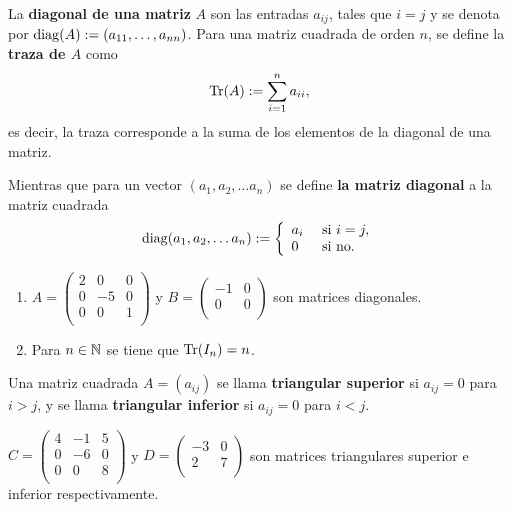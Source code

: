 \begin{defin}
La \textbf{diagonal de una matriz} $A$ son las entradas $a_{i j}$, tales que $i=j$ y se denota por $\operatorname{diag}(A):=(a_{11}, \dots, a_{nn})$.
Para una matriz cuadrada de orden $n$, se define la \textbf{traza de $A$} como
\[\operatorname{Tr}(A):=\sum_{i=1}^{n} a_{ii},\]
es decir, la traza corresponde a la suma de los elementos de la diagonal de una matriz.

Mientras que para un vector $(a_{1} ,a_{2} ,  \dots  a_{n})$ se define \textbf{la matriz diagonal} a la matriz cuadrada
\[\operatorname{diag}(a_{1} ,a_{2} ,  \dots  a_{n}):=\left\{\begin{array}{ll}
    a_i & \text{ si } i=j,\\
    0 & \text{ si no.}
\end{array}\right.\]
\end{defin}


\begin{ejem}
\begin{enumerate}
    \item     $A=\begin{pmatrix}
    2 & 0 & 0\\
    0 & -5 & 0\\
    0 & 0 & 1\\
    \end{pmatrix}
    $ y $B=\begin{pmatrix}
    -1 & 0 \\
    0 & 0 \\
    \end{pmatrix}$ son matrices diagonales.
    \item Para $n\in \mathbb{N}$ se tiene que $\operatorname{Tr}(I_n)=n$.
\end{enumerate}

\end{ejem}


\begin{defin}
Una matriz cuadrada $A = (a_{i j})$ se llama \textbf{triangular
superior} si $a_{i j} = 0$ para $i > j$, y se llama \textbf{triangular inferior}
si $a_{i j} = 0$ para $i < j$.

\end{defin}

\begin{ejem}
    $C=\begin{pmatrix}
    4 & -1 & 5\\
    0 & -6 & 0\\
    0 & 0 & 8\\
    \end{pmatrix}
    $ y $D=\begin{pmatrix}
    -3 & 0 \\
    2 & 7 \\
    \end{pmatrix}$ son matrices triangulares superior e inferior respectivamente.
\end{ejem}

